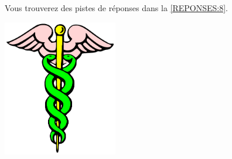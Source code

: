 Vous trouverez des pistes de réponses dans la \autoref{REPONSES:8}.
 \vfill
\begin{center}
 \includegraphics[width=5cm]{images/Caduceus.pdf}
\end{center}
 \vfill

\newpage
\thispagestyle{empty}
